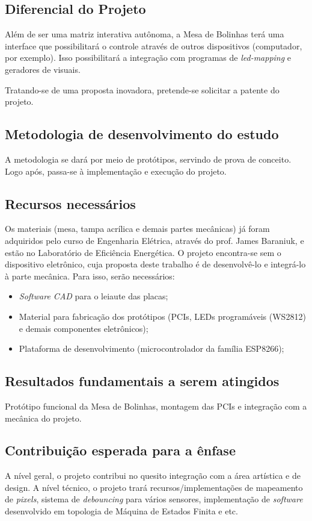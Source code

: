 \documentclass[a4paper,12pt]{article}
\begin{document}
  \subsection{Diferencial do Projeto}
  Além de ser uma matriz interativa autônoma, a Mesa de Bolinhas terá uma interface que possibilitará o controle através de outros dispositivos (computador, por exemplo). Isso possibilitará a integração com programas de \emph{led-mapping} e geradores de visuais.
  
  Tratando-se de uma proposta inovadora, pretende-se solicitar a patente do projeto.
  
  \subsection{Metodologia de desenvolvimento do estudo}
  A metodologia se dará por meio de protótipos, servindo de prova de conceito. Logo após, passa-se à implementação e execução do projeto.
  
\subsection{Recursos necessários}

Os materiais (mesa, tampa acrílica e demais partes mecânicas) já foram adquiridos pelo curso de Engenharia Elétrica, através do prof. James Baraniuk, e estão no Laboratório de Eficiência Energética. O projeto encontra-se sem o dispositivo eletrônico, cuja proposta deste trabalho é de desenvolvê-lo e integrá-lo à parte mecânica. Para isso, serão necessários:

\begin{itemize}
    \item \emph{Software CAD} para o leiaute das placas;
    \item Material para fabricação dos protótipos (PCIs, LEDs programáveis (WS2812) e demais componentes eletrônicos);
    \item Plataforma de desenvolvimento (microcontrolador da família ESP8266);
\end{itemize}

\subsection{Resultados fundamentais a serem atingidos}
Protótipo funcional da Mesa de Bolinhas, montagem das PCIs e integração com a mecânica do projeto.

\subsection{Contribuição esperada para a ênfase}
A nível geral, o projeto contribui no quesito integração com a área artística e de design. A nível técnico, o projeto trará recursos/implementações de mapeamento de \emph{pixels}, sistema de \emph{debouncing} para vários sensores, implementação de \emph{software} desenvolvido em topologia de Máquina de Estados Finita e etc.
\end{document}
